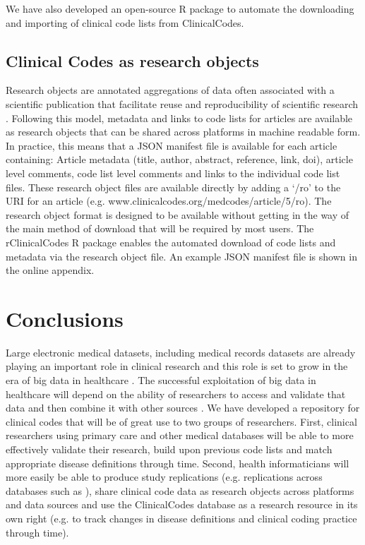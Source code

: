 \documentclass[10pt]{article}
\begin{document}
We have also developed an open-source R package \cite{Springate2014} to automate the downloading and importing of clinical code lists from ClinicalCodes.


\subsection*{Clinical Codes as research objects}


Research objects are annotated aggregations of data often associated with a scientific publication that facilitate reuse and reproducibility of scientific research \cite{Bechhofer2010}. Following this model, metadata and links to code lists for articles are available as research objects that can be shared across platforms in machine readable form.  In practice, this means that a JSON manifest file is available for each article containing: Article metadata (title, author, abstract, reference, link, doi), article level comments, code list level comments and links to the individual code list files. These research object files are available directly by adding a `/ro' to the URI for an article (e.g. www.clinicalcodes.org/medcodes/article/5/ro).  The research object format is designed to be available without getting in the way of the main method of download that will be required by most users.  The rClinicalCodes R package \cite{Springate2014} enables the automated download of code lists and metadata via the research object file. An example JSON manifest file is shown in the online appendix.

\section*{Conclusions}


Large electronic medical datasets, including medical records datasets are already playing an important role in clinical research and this role is set to grow in the era of big data in healthcare \cite{Wang2013}. The successful exploitation of big data in healthcare will depend on the ability of researchers to access and validate that data and then combine it with other sources \cite{Murdoch2013}.  We have developed a repository for clinical codes that will be of great use to two groups of researchers.  First, clinical researchers using primary care and other medical databases will be able to more effectively validate their research, build upon previous code lists and match appropriate disease definitions through time. Second, health informaticians will more easily be able to produce study replications (e.g. replications across databases such as \cite{Reeves2014}), share clinical code data as research objects across platforms and data sources and use the ClinicalCodes database as a research resource in its own right (e.g. to track changes in disease definitions and clinical coding practice through time).
\end{document}
